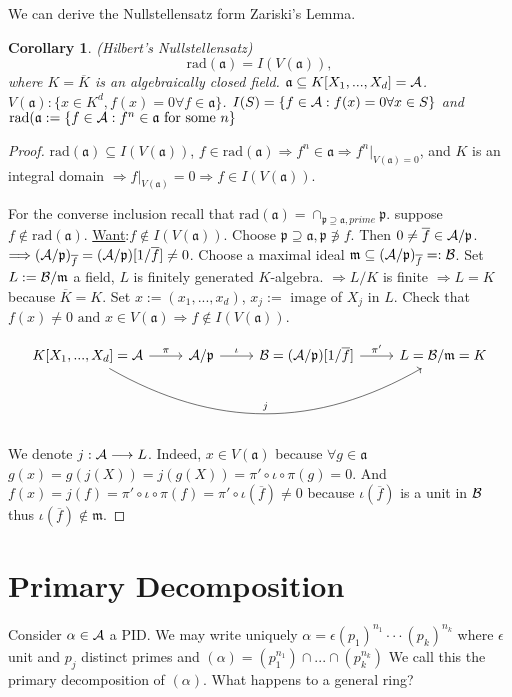 \documentclass[11pt]{article}
\newtheorem{cor}[thm]{Corollary}
\newcommand{\sca}{{\mathfrak a}}
\newcommand{\scm}{{\mathfrak m}}
\newcommand{\scp}{{\mathfrak p}}
\newcommand{\cala}{{\cal A}}
\newcommand{\calb}{{\cal B}}
\newcommand{\Lrta}{\Longrightarrow}
\newcommand{\lrta}{\longrightarrow}
\begin{document}
We can derive the  Nullstellensatz form Zariski's Lemma. 
\begin{cor}\label{cor:Nullstellensatz}(Hilbert's Nullstellensatz)
$$
\text{rad}(\sca)=I(V(\sca)),
$$ 
where $K=\overline{K}$ is an algebraically closed field. $\sca\subseteq K[X_1,...,X_d]=\cala$. $V(\sca):\{x\in K^d, f(x)=0\forall f\in \sca\}$. $I(S)=\{f\in \cala:f(x)=0\forall x\in S\}$ and $\text{rad}(\sca:=\{f\in \cala:f^n\in \sca \text{ for some } n\}$
\end{cor}
\begin{proof}
$\text{rad}(\sca)\subseteq I(V(\sca))$, $f\in \text{rad}(\sca)\Lrta f^n\in \sca\Lrta f^n|_{V(\sca)=0}$, and $K$ is an integral domain $\Lrta f|_{V(\sca)}=0$$\Lrta f\in I(V(\sca))$. 

For the converse inclusion recall that $\text{rad}(\sca)=\cap_{\scp\supseteq \sca, prime}\scp$. suppose $f\notin  \text{rad}(\sca) $. \underline{Want}:$f\notin I(V(\sca))$. Choose $\scp\supseteq \sca,\scp \not \ni f$. Then $0\neq \overline{f}\in \cala/\scp$. $\Lrta (\cala/\scp)_{\overline{f}}=(\cala/\scp)[1/\overline{f}]\neq 0$. Choose a maximal ideal $\scm\subseteq (\cala/\scp)_{\overline{f}}=:\calb$. Set $L:=\calb/\scm$ a field, $L$ is finitely generated $K$-algebra. $\Lrta L/K $ is finite $\Lrta L=K$ because $\overline{K}=K$. Set $x:=(x_1,...,x_d)$, $x_j:=$ image of $X_j$ in $L$. Check that $f(x)\neq 0\text{ and } x\in V(\sca)\Lrta f\notin I(V(\sca))$. 

 \[
\begin{tikzcd}
K[X_1,...,X_d]=\cala\ar[r,"\pi"]\ar[rrr,bend right,"j"]&\cala/\scp\ar[r,"\iota"]&\calb=(\cala/\scp)[1/\overline{f}]\ar[r,"\pi'"] & L=\calb/\scm=K  
\end{tikzcd}
\]

We denote $j:\cala\lrta L$.
Indeed, $x\in V(\sca)$ because $\forall g\in \sca$ $g(x)=g(j(X))=j(g(X))=\pi'\circ\iota\circ\pi(g)=0$. And $f(x)=j(f)=\pi'\circ\iota\circ\pi(f)=\pi'\circ\iota (\overline{f})\neq 0$ because $\iota(\overline{f})$ is a unit in $\calb$ thus $\iota(\overline{f})\notin\scm$.
\end{proof}

\section{Primary Decomposition}
Consider $\alpha\in \cala$ a PID. We may write uniquely $\alpha=\epsilon (p_1)^{n_1}\cdot \cdot\cdot (p_k)^{n_k}$ where $\epsilon$ unit and $p_j$ distinct  primes and $(\alpha)=(p_1^{n_1})\cap...\cap(p_k^{n_k})$ We call this the primary decomposition of $(\alpha)$. What happens to a general ring?
\end{document}
